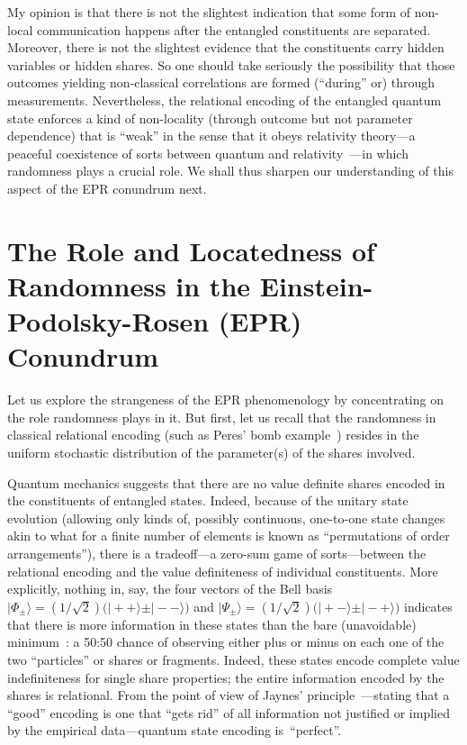 \documentclass[entropy,article,accept,oneauthor,pdftex]{Definitions/mdpi}
\begin{document}
My opinion is that there is not the slightest indication that some form of non-local communication happens after the entangled constituents are separated.
Moreover, there is not the slightest evidence that the constituents carry hidden variables or hidden shares.
So one should take seriously the possibility that those outcomes yielding non-classical correlations are formed (``during'' or) through measurements.
Nevertheless, the relational encoding of the entangled quantum state enforces a kind of non-locality (through outcome but not parameter dependence)
that is ``weak'' in the sense that it obeys relativity theory---a
peaceful coexistence of sorts between quantum and relativity~\cite{shimony2,Jarrett-83,shimony3}---in which randomness plays a crucial role.
We shall thus sharpen our understanding of this aspect of the EPR conundrum next.

\section{The Role and Locatedness of Randomness in the Einstein-Podolsky-Rosen (EPR) Conundrum}

Let us explore the strangeness of the EPR phenomenology by concentrating on the role randomness plays in it.
But first, let us recall that the randomness in classical relational encoding (such as Peres' bomb example~\cite{peres222})
resides in the uniform stochastic distribution of the parameter(s) of the shares involved.

Quantum mechanics suggests that there are no value definite shares encoded in the constituents of entangled states.
Indeed, because of the unitary state evolution (allowing only kinds of, possibly continuous, one-to-one state
changes akin to what for a finite number of elements is known as ``permutations of order arrangements''),
there is a tradeoff---a zero-sum game of sorts---between
the relational encoding and the value definiteness of individual constituents.
More explicitly, nothing in, say, the four vectors of the Bell basis
$
\vert \Phi_\pm \rangle = (1/\sqrt{2})\big( \vert ++ \rangle \pm \vert -- \rangle \big)
$
and
$
\vert \Psi_\pm \rangle = (1/\sqrt{2})\big( \vert +- \rangle \pm \vert -+ \rangle  \big)
$
indicates that there is more information in these states than the bare (unavoidable) minimum~\cite{jaynes}: a 50:50 chance of observing either plus or minus on each one of the two ``particles'' or shares or fragments.
Indeed, these states encode complete value indefiniteness for single share properties; the entire information encoded by the shares is relational.
From the point of view of Jaynes' principle~\cite{jaynes}---stating that a ``good'' encoding is one that ``gets rid'' of all information not justified or implied by the
empirical data---quantum state encoding is~``perfect''.
\end{document}
